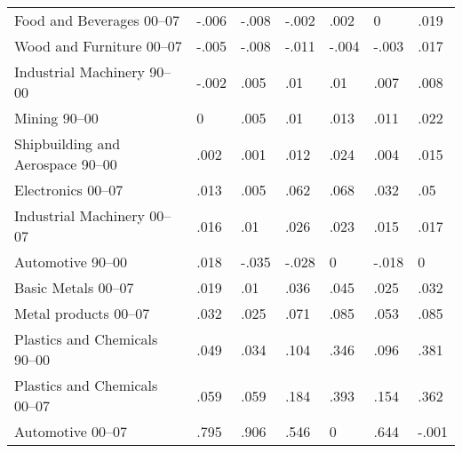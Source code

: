 \begin{table}[tbp] \centering
{}

\begin{tabularx}{\linewidth}{lCCCCCC}

\toprule
Food and Beverages 00--07&-.006&-.008&-.002&.002&0&.019 \tabularnewline
Wood and Furniture 00--07&-.005&-.008&-.011&-.004&-.003&.017 \tabularnewline
Industrial Machinery 90--00&-.002&.005&.01&.01&.007&.008 \tabularnewline
Mining 90--00&0&.005&.01&.013&.011&.022 \tabularnewline
Shipbuilding and Aerospace 90--00&.002&.001&.012&.024&.004&.015 \tabularnewline
Electronics 00--07&.013&.005&.062&.068&.032&.05 \tabularnewline
Industrial Machinery 00--07&.016&.01&.026&.023&.015&.017 \tabularnewline
Automotive 90--00&.018&-.035&-.028&0&-.018&0 \tabularnewline
Basic Metals 00--07&.019&.01&.036&.045&.025&.032 \tabularnewline
Metal products  00--07&.032&.025&.071&.085&.053&.085 \tabularnewline
Plastics and Chemicals 90--00&.049&.034&.104&.346&.096&.381 \tabularnewline
Plastics and Chemicals 00--07&.059&.059&.184&.393&.154&.362 \tabularnewline
Automotive 00--07&.795&.906&.546&0&.644&-.001 \tabularnewline
\bottomrule 

\end{tabularx}
\end{table}
